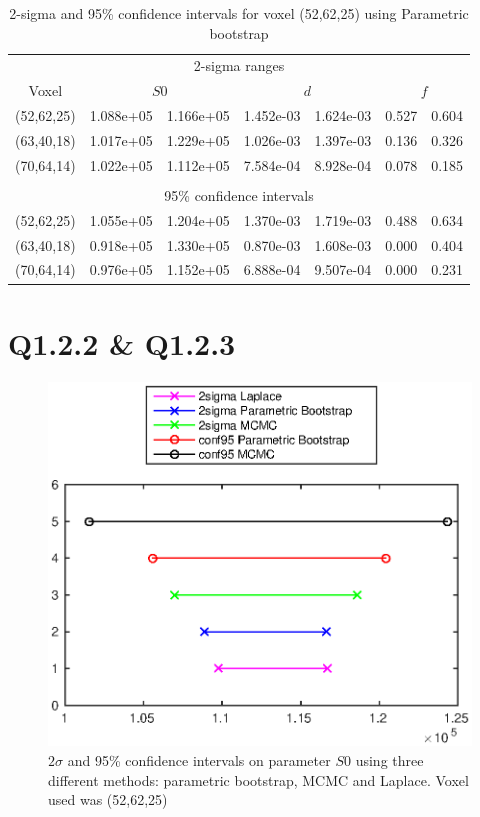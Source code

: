 \documentclass[11pt,a4paper,oneside]{report}
\begin{document}
\begin{table}[H]
\begin{center}
\begin{tabular}{c | c | c | c | c | c | c}
\multicolumn{7}{c}{2-sigma ranges}\\
 Voxel & \multicolumn{2}{c|}{$S0$} & \multicolumn{2}{c|}{$d$} & \multicolumn{2}{c}{$f$}\\ 
 \hline
 (52,62,25) & 1.088e+05 & 1.166e+05 & 1.452e-03 & 1.624e-03 & 0.527 & 0.604\\
 (63,40,18) & 1.017e+05 & 1.229e+05 & 1.026e-03 & 1.397e-03 & 0.136 & 0.326\\
 (70,64,14) & 1.022e+05 & 1.112e+05 & 7.584e-04 & 8.928e-04 & 0.078 & 0.185\\
  \hline
  \multicolumn{7}{c}{}\\
  \multicolumn{7}{c}{95\% confidence intervals}\\
 (52,62,25) & 1.055e+05 & 1.204e+05 & 1.370e-03 & 1.719e-03 & 0.488 & 0.634\\
 (63,40,18) & 0.918e+05 & 1.330e+05 & 0.870e-03 & 1.608e-03 & 0.000 & 0.404\\
 (70,64,14) & 0.976e+05 & 1.152e+05 & 6.888e-04 & 9.507e-04 & 0.000 & 0.231\\
\end{tabular}
\caption{2-sigma and 95\% confidence intervals for voxel (52,62,25) using Parametric bootstrap}
\label{q121tab}
\end{center}
\end{table}


\section*{Q1.2.2 \& Q1.2.3}

\begin{figure}[H]
      \centering
    \includegraphics[scale=1]{figures/q2/q123-p1.eps}
    \caption{$2\sigma$ and 95\% confidence intervals on parameter $S0$ using three different methods: parametric bootstrap, MCMC and Laplace. Voxel used was (52,62,25) }
    \label{q123-p1}
\end{figure}
\end{document}
